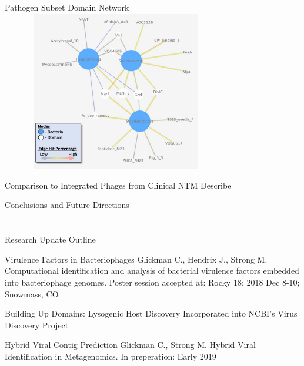 \documentclass[11pt, xcolor=table]{beamer}
\begin{document}
	\begin{frame}{Pathogen Subset Domain Network}
	\center
	\includegraphics[height=7cm, width=10cm]{CPBS_11_18/Pathogenic.jpg}
	\end{frame}
	\begin{frame}{Comparison to Integrated Phages from Clinical NTM}
  Describe
	\end{frame}
	\begin{frame}{Conclusions and Future Directions}
	
	\end{frame}
	
	
\section{}
	\begin{frame}{Research Update Outline}
	\begin{block}{\textcolor{black!50}{Virulence Factors in Bacteriophages}}
	\textcolor{black!50}{\tiny{Glickman C., Hendrix J., Strong M. Computational identification and analysis of bacterial virulence factors embedded into bacteriophage genomes. Poster session accepted at: Rocky 18: 2018 Dec 8-10; Snowmass, CO}}
	\end{block}
	
	\begin{block}{Building Up Domains: Lysogenic Host Discovery}
  Incorporated into NCBI's Virus Discovery Project
	\end{block}

	\begin{block}{\textcolor{black!50}{Hybrid Viral Contig Prediction}}
	\textcolor{black!50}{\tiny{Glickman C., Strong M. Hybrid Viral Identification in Metagenomics. In preperation: Early 2019}}
	\end{block}
	\end{frame}
	
\end{document}
